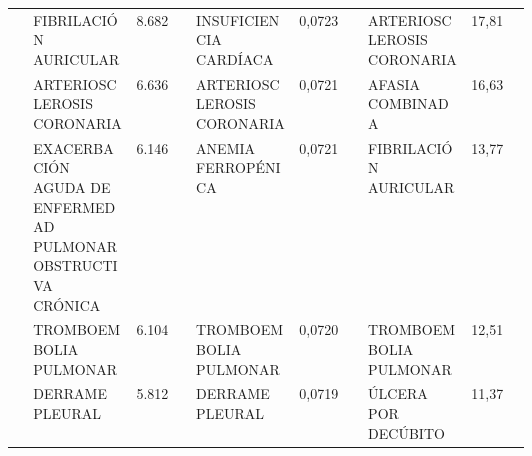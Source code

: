 \begin{landscape}
\begin{longtable}[c]{@{}lp{0.2\linewidth}lp{0.2\linewidth}lp{0.2\linewidth}l@{}}
                                  & FIBRILACIÓN AURICULAR                                         & 8.682  & INSUFICIENCIA CARDÍACA                                 & 0,0723 & ARTERIOSCLEROSIS CORONARIA                                    & 17,81    \\
                                  & ARTERIOSCLEROSIS CORONARIA                                    & 6.636  & ARTERIOSCLEROSIS CORONARIA                             & 0,0721 & AFASIA COMBINADA                                              & 16,63    \\ 
                                  & EXACERBACIÓN AGUDA DE ENFERMEDAD PULMONAR OBSTRUCTIVA CRÓNICA & 6.146  & ANEMIA FERROPÉNICA                                     & 0,0721 & FIBRILACIÓN AURICULAR                                         & 13,77    \\
                                  & TROMBOEMBOLIA PULMONAR                                        & 6.104  & TROMBOEMBOLIA PULMONAR                                 & 0,0720 & TROMBOEMBOLIA PULMONAR                                        & 12,51    \\
                                  & DERRAME PLEURAL                                               & 5.812  & DERRAME PLEURAL                                        & 0,0719 & ÚLCERA POR DECÚBITO                                           & 11,37    \\* \cmidrule(l){2-7} 
\end{longtable}
\end{landscape}

